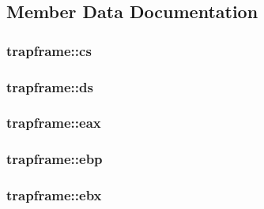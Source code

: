 \subsection{Member Data Documentation}
\subsubsection[{\texorpdfstring{cs}{cs}}]{ trapframe\+::cs}\hypertarget{structtrapframe_a61261f63223a73e25be79fcc8c625265}{}\label{structtrapframe_a61261f63223a73e25be79fcc8c625265}
\subsubsection[{\texorpdfstring{ds}{ds}}]{ trapframe\+::ds}\hypertarget{structtrapframe_a421be1ec9ad2a55f1d1adeac9b0b89c3}{}\label{structtrapframe_a421be1ec9ad2a55f1d1adeac9b0b89c3}
\subsubsection[{\texorpdfstring{eax}{eax}}]{ trapframe\+::eax}\hypertarget{structtrapframe_ab1dd3a10936b61129d7395c3a21bc2fe}{}\label{structtrapframe_ab1dd3a10936b61129d7395c3a21bc2fe}
\subsubsection[{\texorpdfstring{ebp}{ebp}}]{ trapframe\+::ebp}\hypertarget{structtrapframe_a258f414f983f95f6799372d548fbd6d3}{}\label{structtrapframe_a258f414f983f95f6799372d548fbd6d3}
\subsubsection[{\texorpdfstring{ebx}{ebx}}]{ trapframe\+::ebx}\hypertarget{structtrapframe_a0f93026966ea52a69a94870fb394ba04}{}\label{structtrapframe_a0f93026966ea52a69a94870fb394ba04}
